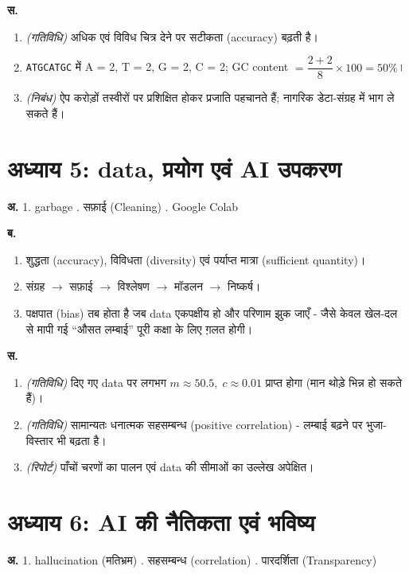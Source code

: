 \noindent\textbf{स.}
\begin{enumerate}[leftmargin=1.6em]
  \item \textit{(गतिविधि)} अधिक एवं विविध चित्र देने पर सटीकता (accuracy) बढ़ती है।
  \item \texttt{ATGCATGC} में A = 2, T = 2, G = 2, C = 2; \;
        GC content $= \dfrac{2+2}{8}\times 100 = 50\%$।
  \item \textit{(निबंध)} ऐप करोड़ों तस्वीरों पर प्रशिक्षित होकर प्रजाति पहचानते हैं;
        नागरिक डेटा-संग्रह में भाग ले सकते हैं।
\end{enumerate}

\section*{अध्याय 5: data, प्रयोग एवं AI उपकरण}
\textbf{अ.} 1. garbage . सफ़ाई (Cleaning) . Google Colab

\noindent\textbf{ब.}
\begin{enumerate}[leftmargin=1.6em]
  \item शुद्धता (accuracy), विविधता (diversity) एवं पर्याप्त मात्रा (sufficient
        quantity)।
  \item संग्रह $\to$ सफ़ाई $\to$ विश्लेषण $\to$ मॉडलन $\to$ निष्कर्ष।
  \item पक्षपात (bias) तब होता है जब data एकपक्षीय हो और परिणाम झुक जाएँ - जैसे केवल
        खेल-दल से मापी गई “औसत लम्बाई” पूरी कक्षा के लिए ग़लत होगी।
\end{enumerate}

\noindent\textbf{स.}
\begin{enumerate}[leftmargin=1.6em]
  \item \textit{(गतिविधि)} दिए गए data पर लगभग $m \approx 50.5,\; c \approx 0.01$
        प्राप्त होगा (मान थोड़े भिन्न हो सकते हैं)।
  \item \textit{(गतिविधि)} सामान्यतः धनात्मक सहसम्बन्ध (positive correlation) -
        लम्बाई बढ़ने पर भुजा-विस्तार भी बढ़ता है।
  \item \textit{(रिपोर्ट)} पाँचों चरणों का पालन एवं data की सीमाओं का उल्लेख अपेक्षित।
\end{enumerate}

\section*{अध्याय 6: AI की नैतिकता एवं भविष्य}
\textbf{अ.} 1. hallucination (मतिभ्रम) . सहसम्बन्ध (correlation) . पारदर्शिता (Transparency)

